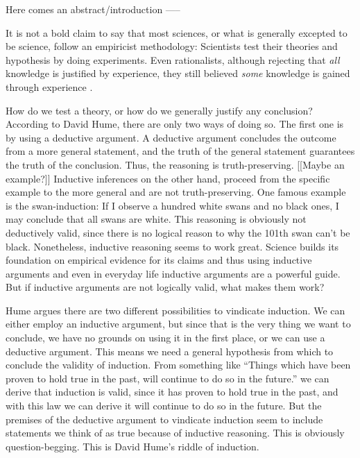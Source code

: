Here comes an abstract/introduction -----


It is not a bold claim to say that most sciences,
or what is generally excepted to be science, follow
an empiricist methodology:
Scientists test their theories and hypothesis by doing experiments.
Even rationalists, although rejecting that \emph{all}
knowledge is justified by experience,
they still believed \emph{some} knowledge is gained through experience
\cite[9]{philsciencebook}.

How do we test a theory, or how do we generally justify
any conclusion?
According to David Hume, there are only two ways of doing so.
The first one is by using a deductive argument.
A deductive argument concludes the outcome from a
more general statement, and the truth of the general statement
guarantees the truth of the conclusion. Thus, the reasoning
is truth-preserving.
[[Maybe an example?]]
Inductive inferences on the other hand, proceed from
the specific example to the more general and are not
truth-preserving.
One famous example is the swan-induction:
If I observe a hundred white swans and no black ones, I may conclude
that all swans are white.
This reasoning is obviously not deductively valid, since
there is no logical reason to why the 101th swan can't be black.
Nonetheless, inductive reasoning seems to
work great.
Science builds its foundation on empirical evidence for its
claims and thus using inductive arguments and even in everyday
life inductive arguments are a powerful guide.
But if inductive arguments are not logically valid, what makes them work?

Hume argues there are two different possibilities to vindicate induction.
We can either employ an inductive argument, but since that is
the very thing we want to conclude, we have no grounds on
using it in the first place, or we can use a deductive argument.
This means we need a general hypothesis from which to conclude the
validity of induction.
From something like \enquote{Things which have been proven to hold true in
    the past, will continue to do so in the future.} we can derive
that induction is valid, since it has proven to hold true in the past,
and with this law we can derive it will continue to do so in the future.
But the premises of the deductive argument to vindicate induction
seem to include statements we think of as true because of inductive
reasoning. This is obviously question-begging.
This is David Hume's riddle of induction.
